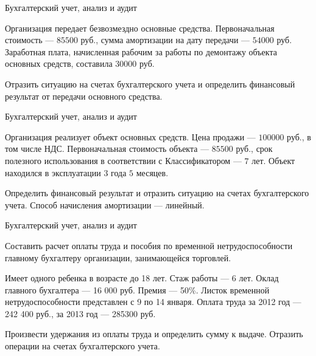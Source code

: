 \documentclass[
	11pt,
	a4paper,
	]
	{article}
\begin{document}
 {Бухгалтерский учет, анализ и аудит}
\prGE

	Организация передает безвозмездно основные средства. Первоначальная стоимость --- $85 500$ руб., сумма амортизации на дату передачи --- $54 000$ руб. Заработная плата, начисленная рабочим за работы по демонтажу объекта основных средств, составила $30000$ руб. 
	\medskip

	Отразить ситуацию на счетах бухгалтерского учета и определить финансовый результат от передачи основного средства.

\begin{center}\lowGE * \end{center}
\newpage




 {Бухгалтерский учет, анализ и аудит}
\prGE

	Организация реализует объект основных средств. Цена продажи --- $100 000$ руб., в том числе НДС. Первоначальная стоимость объекта --- $85 500$ руб., срок полезного использования в соответствии с Классификатором --- $7$ лет. Объект находился в 	эксплуатации $3$ года $5$ месяцев. 
	\medskip

	Определить финансовый результат и отразить ситуацию на счетах бухгалтерского учета. Способ начисления амортизации --- линейный.
	
\begin{center}\lowGE * \end{center}
\newpage





 {Бухгалтерский учет, анализ и аудит}
\prGE

	Составить расчет оплаты труда и пособия по временной нетрудоспособности главному бухгалтеру организации, занимающейся торговлей. 
	\medskip

	Имеет одного ребенка в возрасте до 18 лет. Стаж работы --- 6 лет. Оклад главного бухгалтера --- 16 000 руб. Премия --- 50\%. Листок временной нетрудоспособности представлен с 9 по 14 января. Оплата труда за 2012 год --- 242 400 руб., за 2013 год --- 285300 руб. 
	\medskip

	Произвести удержания из оплаты труда и определить сумму к выдаче. Отразить операции на счетах бухгалтерского учета.

\begin{center}\lowGE * \end{center}
\newpage
\end{document}
